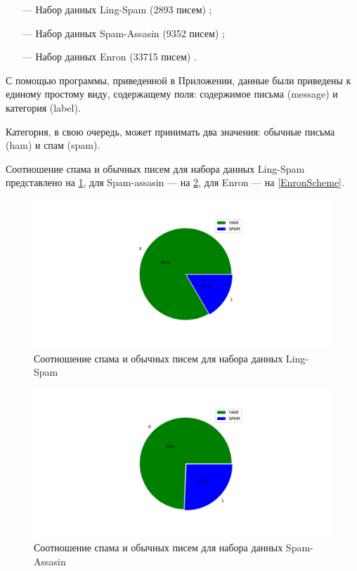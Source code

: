 \begin{itemize}
    \item[—] Набор данных Ling-Spam (2893 писем) \cite{LingSpam};
    \item[—] Набор данных Spam-Assasin (9352 писем) \cite{SpamAssasin};
    \item[—] Набор данных Enron (33715 писем) \cite{Enron}.
\end{itemize}
С помощью программы, приведенной в Приложении, данные были приведены к единому простому виду, содержащему поля:
содержимое письма (message) и категория (label).

Категория, в свою очередь, может принимать два значения: обычные письма (ham) и спам (spam).

Соотношение спама и обычных писем для набора данных Ling-Spam представлено на \ref{LingSpamScheme},
для Spam-assasin — на \ref{SpamAssasinScheme}, для Enron — на \ref{EnronScheme}.

\begin{figure}[H]
    \centering
    \includegraphics[width=150mm]{static/ling_spam.png}
    \caption{Соотношение спама и обычных писем для набора данных Ling-Spam}
    \label{LingSpamScheme}
\end{figure}

\begin{figure}[H]
    \centering
    \includegraphics[width=150mm]{static/spam_assasin.png}
    \caption{Соотношение спама и обычных писем для набора данных Spam-Assasin}
    \label{SpamAssasinScheme}
\end{figure}

